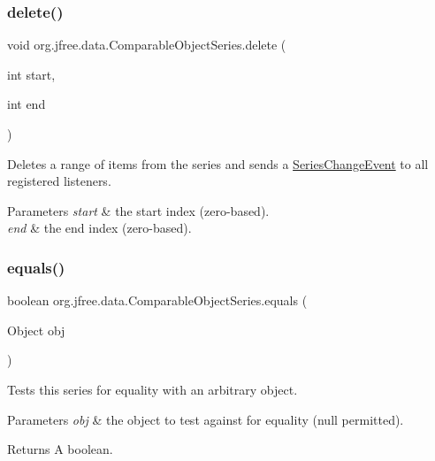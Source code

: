 \subsubsection{\texorpdfstring{delete()}{delete()}}
{\footnotesize\ttfamily void org.\+jfree.\+data.\+Comparable\+Object\+Series.\+delete (\begin{DoxyParamCaption}\item[{int}]{start,  }\item[{int}]{end }\end{DoxyParamCaption})\hspace{0.3cm}{\ttfamily [protected]}}

Deletes a range of items from the series and sends a \mbox{\hyperlink{}{Series\+Change\+Event}} to all registered listeners.


\begin{DoxyParams}{Parameters}
{\em start} & the start index (zero-\/based). \\
\hline
{\em end} & the end index (zero-\/based). \\
\hline
\end{DoxyParams}
\mbox{\label{classorg_1_1jfree_1_1data_1_1_comparable_object_series_a895422199608f70ac2a2ca39a835c4bb}} 
\subsubsection{\texorpdfstring{equals()}{equals()}}
{\footnotesize\ttfamily boolean org.\+jfree.\+data.\+Comparable\+Object\+Series.\+equals (\begin{DoxyParamCaption}\item[{Object}]{obj }\end{DoxyParamCaption})}

Tests this series for equality with an arbitrary object.


\begin{DoxyParams}{Parameters}
{\em obj} & the object to test against for equality ({\ttfamily null} permitted).\\
\hline
\end{DoxyParams}
\begin{DoxyReturn}{Returns}
A boolean. 
\end{DoxyReturn}
\mbox{\label{classorg_1_1jfree_1_1data_1_1_comparable_object_series_a1f6534ba68282f20dd9fdfc324d71f70}} 
